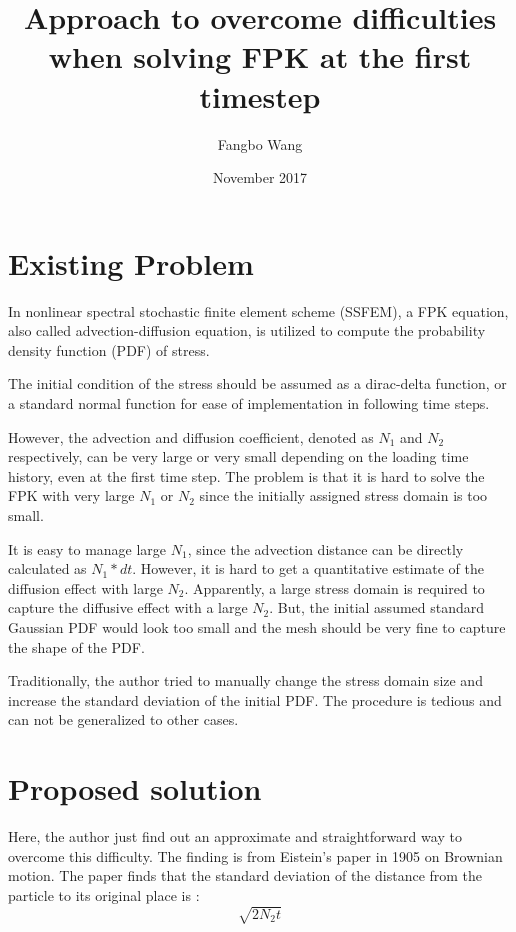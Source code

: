 \documentclass[12pt]{article}
\title{Approach to overcome difficulties when solving FPK at the first timestep}
\author{Fangbo Wang}
\date{November 2017}
\begin{document}
\maketitle

\section{Existing Problem}

In nonlinear spectral stochastic finite element scheme (SSFEM), a FPK equation, also called advection-diffusion equation, is utilized to compute the probability density function (PDF) of stress. 

The initial condition of the stress should be assumed as a dirac-delta function, or a standard normal function for ease of implementation in following time steps.

However, the advection and diffusion coefficient, denoted as $N_1$ and $N_2$ respectively, can be very large or very small depending on the loading time history, even at the first time step. The problem is that it is hard to solve the FPK with very large $N_1$ or $N_2$ since the initially assigned stress domain is too small. 

It is easy to manage large $N_1$, since the advection distance can be directly calculated as $N_1*dt$. However, it is hard to get a quantitative estimate of the diffusion effect with large $N_2$. Apparently, a large stress domain is required to capture the diffusive effect with a large $N_2$. But, the initial assumed standard Gaussian PDF would look too small and the mesh should be very fine to capture the shape of the PDF.

Traditionally, the author tried to manually change the stress domain size and increase the standard deviation of the initial PDF. The procedure is tedious and can not be generalized to other cases.

\section{Proposed solution}
Here, the author just find out an approximate and straightforward way to overcome this difficulty. The finding is from Eistein's paper in 1905 on Brownian motion. The paper finds that the standard deviation of the distance from the particle to its original place is :
\begin{equation}
    \sqrt{2N_2t}
    \label{eq01}
\end{equation}
\end{document}
